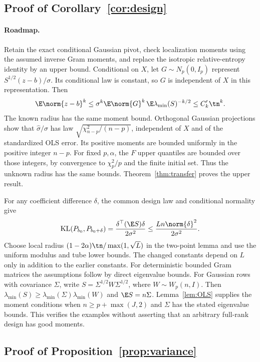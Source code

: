 \subsection{Proof of Corollary~\ref{cor:design}}
\paragraph{Roadmap.} Retain the exact conditional Gaussian pivot, check localization moments using the assumed inverse Gram moments, and replace the isotropic relative-entropy identity by an upper bound.
Conditional on $X$, let $G\sim N_p(0,I_p)$ represent $S^{1/2}(z-b)/\sigma$. Its conditional law is constant, so $G$ is independent of $X$ in this representation. Then
\[
 \E\norm{z-b}^k\le\sigma^k\E\norm{G}^k\,
                            \E\lambda_{\min}(S)^{-k/2}
 \le C'_k\tn^k.
\]
The known radius has the same moment bound. Orthogonal Gaussian projections show that $\widehat\sigma/\sigma$ has law $\sqrt{\chi^2_{n-p}/(n-p)}$, independent of $X$ and of the standardized OLS error. Its positive moments are bounded uniformly in the positive integer $n-p$. For fixed $p,\alpha$, the $F$ upper quantiles are bounded over those integers, by convergence to $\chi_p^2/p$ and the finite initial set. Thus the unknown radius has the same bounds. Theorem~\ref{thm:transfer} proves the upper result.

For any coefficient difference $\delta$, the common design law and conditional normality give
\[
 \operatorname{KL}(P_{b_0},P_{b_0+\delta})
 =\frac{\delta^\top(\E S)\delta}{2\sigma^2}
 \le\frac{Ln\norm{\delta}^2}{2\sigma^2}.
\]
Choose local radius $(1-2\alpha)\tn/\max(1,\sqrt L)$ in the two-point lemma and use the uniform modulus and tube lower bounds. The changed constants depend on $L$ only in addition to the earlier constants.
For deterministic bounded Gram matrices the assumptions follow by direct eigenvalue bounds. For Gaussian rows with covariance $\Sigma$, write $S=\Sigma^{1/2}W\Sigma^{1/2}$, where $W\sim W_p(n,I)$. Then $\lambda_{\min}(S)\ge\lambda_{\min}(\Sigma)\lambda_{\min}(W)$ and $\E S=n\Sigma$. Lemma~\ref{lem:OLS} supplies the moment conditions when $n\ge p+\max(J,2)$ and $\Sigma$ has the stated eigenvalue bounds. This verifies the examples without asserting that an arbitrary full-rank design has good moments.

\subsection{Proof of Proposition~\ref{prop:variance}}
